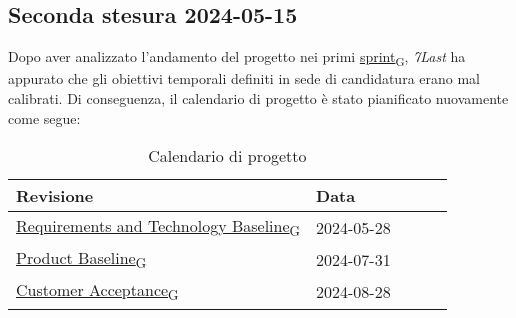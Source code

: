\subsection{Seconda stesura 2024-05-15}
Dopo aver analizzato l'andamento del progetto nei primi \href{https://7last.github.io/docs/rtb/documentazione-interna/glossario\#sprint}{sprint\textsubscript{G}}, \textit{7Last} ha appurato che gli obiettivi temporali definiti in sede di candidatura erano mal calibrati. Di conseguenza, il calendario di progetto è stato pianificato nuovamente come segue:
\begin{table}[!h]
    \begin{center}
        \begin{tabular}{ | l | l | l | l | l | }
            \hline
            Revisione                               & Data       \\ \hline
            \href{https://7last.github.io/docs/rtb/documentazione-interna/glossario\#requirements-and-technology-baseline}{Requirements and Technology Baseline\textsubscript{G}}    & 2024-05-28 \\
            \href{https://7last.github.io/docs/rtb/documentazione-interna/glossario\#product-baseline}{Product Baseline\textsubscript{G}}                        & 2024-07-31 \\
            \href{https://7last.github.io/docs/rtb/documentazione-interna/glossario\#customer-acceptance}{Customer Acceptance\textsubscript{G}}                     & 2024-08-28 \\
            \hline
        \end{tabular}
    \end{center}
    \caption{Calendario di progetto}
\end{table}